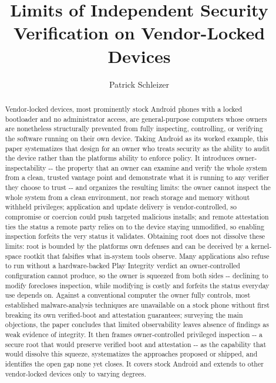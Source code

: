 \documentclass[
  manuscript,
  review,
  nonacm]{acmart}
\author{}
\date{}
\title{Limits of Independent Security Verification on Vendor-Locked Devices}
\author{Patrick Schleizer}
\begin{document}
\begin{abstract}
Vendor-locked devices, most prominently stock Android phones with a
locked bootloader and no administrator access, are general-purpose
computers whose owners are nonetheless structurally prevented from fully
inspecting, controlling, or verifying the software running on their own
device. Taking Android as its worked example, this paper systematizes
that design for an owner who treats security as the ability to audit the
device rather than the platform\textquotesingle s ability to enforce
policy. It introduces owner-inspectability -\/- the property that an
owner can examine and verify the whole system from a clean, trusted
vantage point and demonstrate what it is running to any verifier they
choose to trust -\/- and organizes the resulting limits: the owner
cannot inspect the whole system from a clean environment, nor reach
storage and memory without withheld privileges; application and update
delivery is vendor-controlled, so compromise or coercion could push
targeted malicious installs; and remote attestation ties the status a
remote party relies on to the device staying unmodified, so enabling
inspection forfeits the very status it validates. Obtaining root does
not dissolve these limits: root is bounded by the
platform\textquotesingle s own defenses and can be deceived by a
kernel-space rootkit that falsifies what in-system tools observe. Many
applications also refuse to run without a hardware-backed Play Integrity
verdict an owner-controlled configuration cannot produce, so the owner
is squeezed from both sides -\/- declining to modify forecloses
inspection, while modifying is costly and forfeits the status everyday
use depends on. Against a conventional computer the owner fully
controls, most established malware-analysis techniques are unavailable
on a stock phone without first breaking its own verified-boot and
attestation guarantees; surveying the main objections, the paper
concludes that limited observability leaves absence of findings as weak
evidence of integrity. It then frames owner-controlled privileged
inspection -\/- a secure root that would preserve verified boot and
attestation -\/- as the capability that would dissolve this squeeze,
systematizes the approaches proposed or shipped, and identifies the open
gap none yet closes. It covers stock Android and extends to other
vendor-locked devices only to varying degrees.
\end{abstract}
\maketitle
\end{document}
